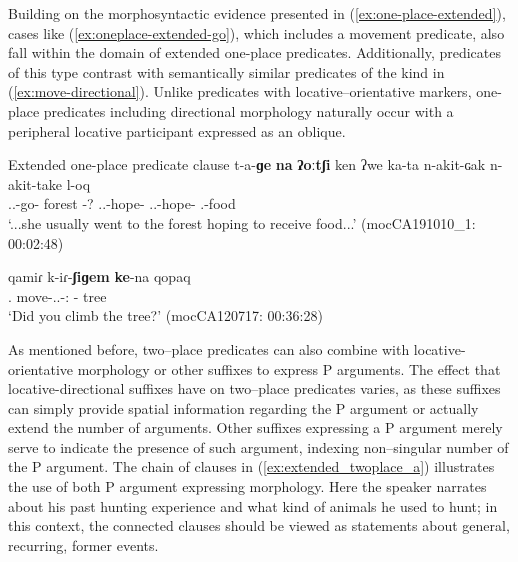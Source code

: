 \documentclass[12pt]{article}
\begin{document}
 
Building on the morphosyntactic evidence presented in (\ref{ex:one-place-extended}), cases like (\ref{ex:oneplace-extended-go}), which includes a movement predicate, also fall within the domain of extended one-place predicates. Additionally, predicates of this type contrast with semantically similar predicates of the kind in (\ref{ex:move-directional}). Unlike predicates with locative--orientative markers, one-place predicates including directional morphology naturally occur with a peripheral locative participant expressed as an oblique. 
   
\begin{exe}
 \ex Extended one-place predicate clause
 \gll t-a-\textbf{ɡe} \textbf{na} \textbf{ʔoːtʃi} ken ʔwe ka-ta n-akit-ɢak n-akit-take l-oq\\
  {\Third.\II.\Intr}-go-{\LocThree} {\DetOne} forest  {\Adv} {\Exist} {\DetFive}-{?} {\Third.\Indet.\Poss}-hope-{\Nmlz} {\Third.\Indet.\Poss}-hope-{\Des} {\Third.\Poss}-food\\
 \trans ‘...she usually went to the forest hoping to receive food...'  
 \trans \hfill (mocCA191010\_1: 00:02:48) \label{ex:oneplace-extended-go}
\end{exe}
\newpage

\begin{exe}
\ex \label{ex:move-directional}
\gll qamiɾ k-iɾ-\textbf{ʃiɡem} \textbf{ke}-na qopaq \\
 {\Second\Sg.\Pron} move-{\Second.\Sg.\II}-{\Dir:\Up} {\Obl}-{\DetThree} tree 
 \\
 \trans `Did you climb the tree?' \hfill (mocCA120717: 00:36:28)
\end{exe}


As mentioned before, two--place predicates can also combine with locative-orientative morphology or other suffixes to express P arguments. The effect that locative-directional suffixes have on two--place predicates varies, as these suffixes can simply provide spatial information regarding  the P argument or actually extend the number of arguments. Other suffixes expressing a P argument merely serve to indicate the presence of such argument, indexing non--singular number of the P argument. The chain of clauses in (\ref{ex:extended_twoplace_a}) illustrates the use of both P argument expressing morphology. Here the speaker narrates about his past hunting experience and what kind of animals he used to hunt; in this context, the connected clauses should be viewed as statements about general, recurring, former events.  
\end{document}
